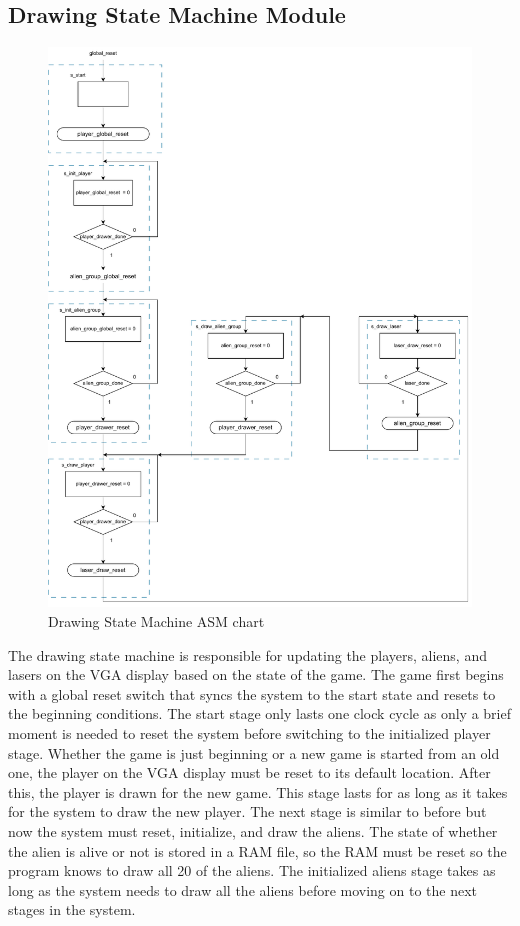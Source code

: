 \documentclass[11pt, titlepage]{article}
\begin{document}
        \subsection{Drawing State Machine Module}
            \begin{figure}[H]
                \centering
                \includegraphics[scale = 0.59]{Images/Drawing State Machine ASM.pdf}
                \caption{Drawing State Machine ASM chart}
            \end{figure}
            The drawing state machine is responsible for updating the players, aliens, and lasers on the VGA display based on the state of the game. The game first begins with a global reset switch that syncs the system to the start state and resets to the beginning conditions. The start stage only lasts one clock cycle as only a brief moment is needed to reset the system before switching to the initialized player stage. Whether the game is just beginning or a new game is started from an old one, the player on the VGA display must be reset to its default location. After this, the player is drawn for the new game. This stage lasts for as long as it takes for the system to draw the new player. The next stage is similar to before but now the system must reset, initialize, and draw the aliens. The state of whether the alien is alive or not is stored in a RAM file, so the RAM must be reset so the program knows to draw all 20 of the aliens. The initialized aliens stage takes as long as the system needs to draw all the aliens before moving on to the next stages in the system.
\end{document}
